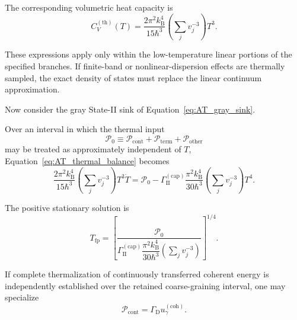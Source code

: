 The corresponding volumetric heat capacity is
\begin{equation}
    C_V^{(\mathrm{th})}(T)
    =
    \frac{
        2\pi^2k_{\mathrm B}^4
    }{
        15\hbar^3
    }
    \left(
        \sum_j
        v_j^{-3}
    \right)
    T^3.
    \label{eq:AT_total_linear_heat_capacity}
\end{equation}

These expressions apply only within the low-temperature linear portions of
the specified branches. If finite-band or nonlinear-dispersion effects are
thermally sampled, the exact density of states must replace the linear
continuum approximation.

Now consider the gray State-II sink of
Equation~\eqref{eq:AT_gray_sink}.

Over an interval in which the thermal input
\begin{equation}
    \mathcal P_0
    \equiv
    \mathcal P_{\mathrm{cont}}
    +
    \mathcal P_{\mathrm{term}}
    +
    \mathcal P_{\mathrm{other}}
    \label{eq:AT_constant_thermal_input}
\end{equation}
may be treated as approximately independent of \(T\),
Equation~\eqref{eq:AT_thermal_balance}
becomes
\begin{equation}
    \frac{
        2\pi^2k_{\mathrm B}^4
    }{
        15\hbar^3
    }
    \left(
        \sum_j
        v_j^{-3}
    \right)
    T^3\dot T
    =
    \mathcal P_0
    -
    \Gamma_{\mathrm{II}}^{(\mathrm{cap})}
    \frac{
        \pi^2k_{\mathrm B}^4
    }{
        30\hbar^3
    }
    \left(
        \sum_j
        v_j^{-3}
    \right)
    T^4.
    \label{eq:AT_gray_temperature_evolution}
\end{equation}

The positive stationary solution is
\begin{equation}
    T_{\mathrm{fp}}
    =
    \left[
        \frac{
            \mathcal P_0
        }{
            \Gamma_{\mathrm{II}}^{(\mathrm{cap})}
            \dfrac{
                \pi^2k_{\mathrm B}^4
            }{
                30\hbar^3
            }
            \left(
                \displaystyle\sum_j
                v_j^{-3}
            \right)
        }
    \right]^{1/4}.
    \label{eq:AT_temperature_fixed_point}
\end{equation}

If complete thermalization of continuously transferred coherent energy is
independently established over the retained coarse-graining interval, one may
specialize
\begin{equation}
    \mathcal P_{\mathrm{cont}}
    =
    \Gamma_{\mathrm D}
    u_\gamma^{(\mathrm{coh})}.
    \label{eq:AT_complete_thermalization_specialization}
\end{equation}

